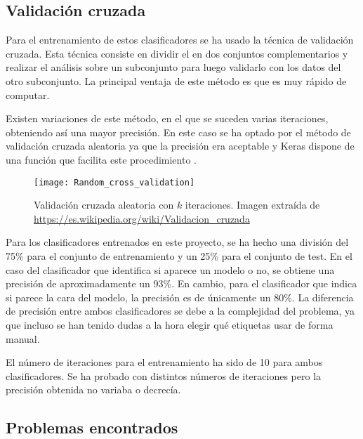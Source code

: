 \newpage

\subsection{Validación cruzada}
Para el entrenamiento de estos clasificadores se ha usado la técnica de validación cruzada. Esta técnica consiste en dividir el  en dos conjuntos complementarios y realizar el análisis sobre un subconjunto para luego validarlo con los datos del otro subconjunto. La principal ventaja de este método es que es muy rápido de computar.

Existen variaciones de este método, en el que se suceden varias iteraciones, obteniendo así una mayor precisión. En este caso se ha optado por el método de validación cruzada aleatoria ya que la precisión era aceptable y Keras dispone de una función que facilita este procedimiento \cite{wiki:cruzada}. 

\FloatBarrier
    \begin{figure}[!h]
    \centering
    \texttt{[image: Random\_cross\_validation]}
    \caption[Validación cruzada aleatoria con $k$ iteraciones]{Validación cruzada aleatoria con $k$ iteraciones. Imagen extraída de \url{https://es.wikipedia.org/wiki/Validacion\_cruzada}}
    \label{fig}
    \end{figure}
\FloatBarrier

Para los clasificadores entrenados en este proyecto, se ha hecho una división del 75\% para el conjunto de entrenamiento y un 25\% para el conjunto de test. En el caso del clasificador que identifica si aparece un modelo o no, se obtiene una precisión de aproximadamente un 93\%. En cambio, para el clasificador que indica si parece la cara del modelo, la precisión es de únicamente un 80\%. La diferencia de precisión entre ambos clasificadores se debe a la complejidad del problema, ya que incluso se han tenido dudas a la hora elegir qué etiquetas usar de forma manual.


El número de iteraciones para el entrenamiento ha sido de 10 para ambos clasificadores. Se ha probado con distintos números de iteraciones pero la precisión obtenida no variaba o decrecía.


\subsection{Problemas encontrados}

